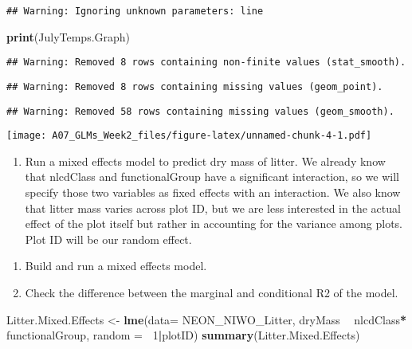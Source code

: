 \documentclass[]{article}
\newenvironment{Shaded}{\begin{snugshade}}{\end{snugshade}}
\newcommand{\DataTypeTok}[1]{\textcolor[rgb]{0.13,0.29,0.53}{#1}}
\newcommand{\DecValTok}[1]{\textcolor[rgb]{0.00,0.00,0.81}{#1}}
\newcommand{\KeywordTok}[1]{\textcolor[rgb]{0.13,0.29,0.53}{\textbf{#1}}}
\newcommand{\NormalTok}[1]{#1}
\newcommand{\OperatorTok}[1]{\textcolor[rgb]{0.81,0.36,0.00}{\textbf{#1}}}
\newcommand{\StringTok}[1]{\textcolor[rgb]{0.31,0.60,0.02}{#1}}
\providecommand{\tightlist}{%
  \setlength{\itemsep}{0pt}\setlength{\parskip}{0pt}}
\begin{document}
\begin{verbatim}
## Warning: Ignoring unknown parameters: line
\end{verbatim}

\begin{Shaded}
\begin{Highlighting}[]
\KeywordTok{print}\NormalTok{(JulyTemps.Graph)}
\end{Highlighting}
\end{Shaded}

\begin{verbatim}
## Warning: Removed 8 rows containing non-finite values (stat_smooth).
\end{verbatim}

\begin{verbatim}
## Warning: Removed 8 rows containing missing values (geom_point).
\end{verbatim}

\begin{verbatim}
## Warning: Removed 58 rows containing missing values (geom_smooth).
\end{verbatim}

\texttt{[image: A07\_GLMs\_Week2\_files/figure-latex/unnamed-chunk-4-1.pdf]}

\begin{enumerate}
\def\labelenumi{\arabic{enumi}.}
\setcounter{enumi}{8}
\tightlist
\item
  Run a mixed effects model to predict dry mass of litter. We already
  know that nlcdClass and functionalGroup have a significant
  interaction, so we will specify those two variables as fixed effects
  with an interaction. We also know that litter mass varies across plot
  ID, but we are less interested in the actual effect of the plot itself
  but rather in accounting for the variance among plots. Plot ID will be
  our random effect.
\end{enumerate}

\begin{enumerate}
\def\labelenumi{\alph{enumi}.}
\tightlist
\item
  Build and run a mixed effects model.
\item
  Check the difference between the marginal and conditional R2 of the
  model.
\end{enumerate}

\begin{Shaded}
\begin{Highlighting}[]
\NormalTok{Litter.Mixed.Effects <-}\StringTok{ }\KeywordTok{lme}\NormalTok{(}\DataTypeTok{data=}\NormalTok{ NEON_NIWO_Litter, dryMass }\OperatorTok{~}\StringTok{ }\NormalTok{nlcdClass}\OperatorTok{*}
\StringTok{                            }\NormalTok{functionalGroup, }\DataTypeTok{random  =} \OperatorTok{~}\DecValTok{1}\OperatorTok{|}\NormalTok{plotID) }
\KeywordTok{summary}\NormalTok{(Litter.Mixed.Effects)}
\end{Highlighting}
\end{Shaded}
\end{document}
